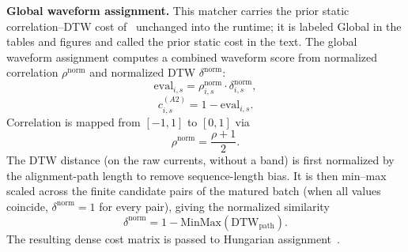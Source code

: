 \documentclass{ieeeaccess}
\newif\ifhighlight \highlightfalse
\DeclareRobustCommand{\revised}[1]{\ifhighlight{\color{blue}#1}\else{\color{.}#1}\fi}
\begin{document}
    \textbf{Global waveform assignment.}
    \revised{This matcher carries the prior static correlation--DTW cost of~\cite{b14} unchanged into the runtime; it is labeled Global in the tables and figures and called the prior static cost in the text.}
    The global waveform assignment computes a combined waveform score from normalized correlation $\rho^{\text{norm}}$ and normalized DTW $\delta^{\text{norm}}$:
    \begin{equation}\label{eq:e8}
        \text{eval}_{i,s} = \rho^{\text{norm}}_{i,s} \cdot \delta^{\text{norm}}_{i,s},
    \end{equation}
    \begin{equation}\label{eq:e9}
        c^{(A2)}_{i,s} = 1 - \text{eval}_{i,s}.
    \end{equation}
    Correlation is mapped from $[-1, 1]$ to $[0, 1]$ via
    \begin{equation}\label{eq:rhonorm}
        \rho^{\text{norm}} = \frac{\rho + 1}{2}.
    \end{equation}
    The DTW distance \revised{(on the raw currents, without a band)} is first normalized by the alignment-path length to remove sequence-length bias.
    It is then min--max scaled across the finite candidate pairs of the matured batch (when all values coincide, $\delta^{\text{norm}} = 1$ for every pair), giving the normalized similarity
    \begin{equation}\label{eq:deltanorm}
        \delta^{\text{norm}} = 1 - \text{MinMax}(\text{DTW}_{\text{path}}).
    \end{equation}
    The resulting dense cost matrix is passed to Hungarian assignment~\cite{b15}.
\end{document}
